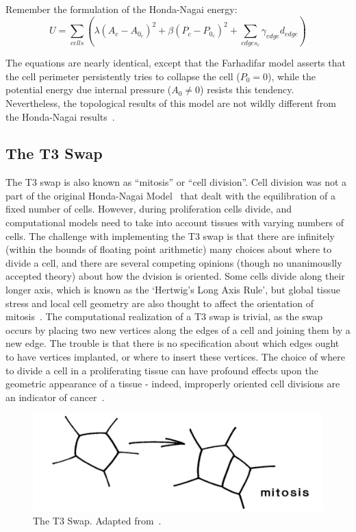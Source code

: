 Remember the formulation of the Honda-Nagai energy:
\begin{equation*}
U = \sum\limits_{cells}\left(\lambda(A_c - A_{0_c})^2 + \beta(P_c - P_{0_c})^2 + \sum_{edges_c}\gamma_{edge}d_{edge}\right)
\end{equation*}

The equations are nearly identical, except that the Farhadifar model asserts that the cell perimeter persistently tries to collapse the cell ($P_0=0$), while the potential energy due internal pressure ($A_0\ne0$) resists this tendency. Nevertheless, the topological results of this model are not wildly different from the Honda-Nagai results~\cite{Farhadifar}.

\subsection{The T3 Swap}
The T3 swap is also known as ``mitosis'' or ``cell division''. Cell division was not a part of the original Honda-Nagai Model~\cite{HondaNagai} that dealt with the equilibration of a fixed number of cells. However, during proliferation cells divide, and computational models need to take into account tissues with varying numbers of cells. The challenge with implementing the T3 swap is that there are infinitely (within the bounds of floating point arithmetic) many choices about where to divide a cell, and there are several competing opinions (though no unanimouslly accepted theory) about how the dvision is oriented. Some cells divide along their longer axis, which is known as the `Hertwig's Long Axis Rule', but global tissue stress and local cell geometry are also thought to affect the orientation of mitosis~\cite{Order, Orientation}. The computational realization of a T3 swap is trivial, as the swap occurs by placing two new vertices along the edges of a cell and joining them by a new edge. The trouble is that there is no specification about which edges ought to have vertices implanted, or where to insert these vertices. The choice of where to divide a cell in a proliferating tissue can have profound effects upon the geometric appearance of a tissue - indeed, improperly oriented cell divisions are an indicator of cancer~\cite{EpithelialTopology, misaligned}. 
\begin{figure}
\centering
\includegraphics[width=\textwidth]{../diagrams/t3.png}
\caption[The T3 Swap.]{The T3 Swap. Adapted from~\cite{Soap}.}
\label{fig:t3}
\end{figure}

